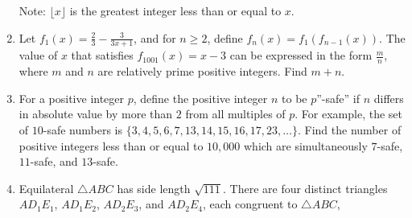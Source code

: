 \documentclass{article}
\begin{document}
\begin{enumerate}[label=\arabic*., itemsep=0.5em]
Note: $\lfloor x \rfloor$ is the greatest integer less than or equal to $x$.\par \vspace{0.5em}\item Let $f_1(x) = \frac23 - \frac3{3x+1}$, and for $n \ge 2$, define $f_n(x) = f_1(f_{n-1}(x))$. The value of $x$ that satisfies $f_{1001}(x) = x-3$ can be expressed in the form $\frac mn$, where $m$ and $n$ are relatively prime positive integers. Find $m+n$.\par \vspace{0.5em}\item For a positive integer $p$, define the positive integer $n$ to be $p$''-safe'' if $n$ differs in absolute value by more than $2$ from all multiples of $p$. For example, the set of $10$-safe numbers is $\{ 3, 4, 5, 6, 7, 13, 14, 15, 16, 17, 23, \ldots\}$. Find the number of positive integers less than or equal to $10,000$ which are simultaneously $7$-safe, $11$-safe, and $13$-safe.\par \vspace{0.5em}\item Equilateral $\triangle ABC$ has side length $\sqrt{111}$. There are four distinct triangles $AD_1E_1$, $AD_1E_2$, $AD_2E_3$, and $AD_2E_4$, each congruent to $\triangle ABC$,

\end{enumerate}
\end{document}
